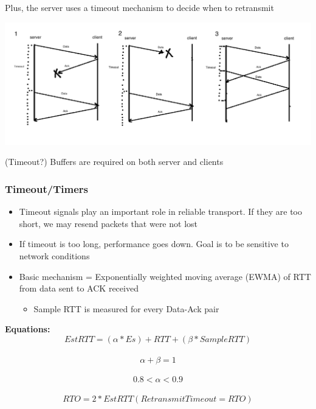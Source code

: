 \documentclass[11pt]{article}
\begin{document}
Plus, the server uses a timeout mechanism to decide when to retransmit

\includegraphics[width=.9\linewidth]{diagrams/timeline2.png}

(Timeout?) Buffers are required on both server and clients

\subsubsection{Timeout/Timers}
\label{sec:orgheadline125}
\begin{itemize}
\item Timeout signals play an important role in reliable transport. If
they are too short, we may resend packets that were not lost
\item If timeout is too long, performance goes down. Goal is to be
sensitive to network conditions
\item Basic mechanism = Exponentially weighted moving average (EWMA) of
RTT from data sent to ACK received
\begin{itemize}
\item Sample RTT is measured for every Data-Ack pair
\end{itemize}
\end{itemize}

\textbf{Equations:}
\[EstRTT = (\alpha * Es) + RTT + (\beta * SampleRTT)\] \\
\[\alpha + \beta = 1\] \\
\[0.8 < \alpha < 0.9\] \\
\[RTO = 2*EstRTT (Retransmit Timeout = RTO)\] \\
\end{document}
